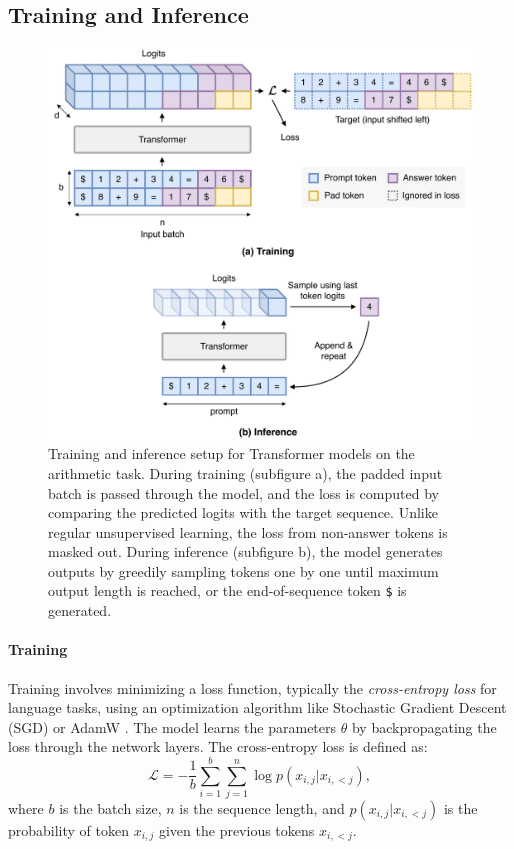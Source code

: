 \subsection{Training and Inference}\label{subsec:training_inference}

\begin{figure}[h!]
    \centering
    \includegraphics[width=\textwidth]{fig/training_and_inference.pdf}
    \caption{Training and inference setup for Transformer models on the arithmetic task. During training (subfigure a), the padded input batch is passed through the model, and the loss is computed by comparing the predicted logits with the target sequence. Unlike regular unsupervised learning, the loss from non-answer tokens is masked out. During inference (subfigure b), the model generates outputs by greedily sampling tokens one by one until maximum output length is reached, or the end-of-sequence token \texttt{\$} is generated.}
    \label{fig:transformer_training_inference}
\end{figure}

\paragraph{Training}
Training involves minimizing a loss function, typically the \emph{cross-entropy loss} for language tasks, using an optimization algorithm like Stochastic Gradient Descent (SGD) or AdamW \parencite{loshchilov_decoupled_2018}. The model learns the parameters $\theta$ by backpropagating the loss through the network layers. The cross-entropy loss is defined as:
\begin{equation*}
    \mathcal{L} = -\frac{1}{b} \sum_{i=1}^{b} \sum_{j=1}^{n} \log p(x_{i,j} | x_{i,<j}),
\end{equation*}
where $b$ is the batch size, $n$ is the sequence length, and $p(x_{i,j} | x_{i,<j})$ is the probability of token $x_{i,j}$ given the previous tokens $x_{i,<j}$.

